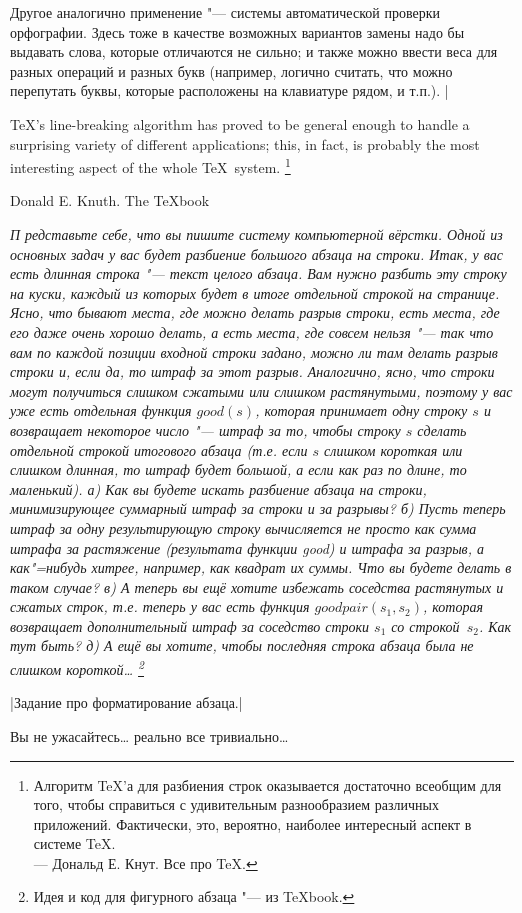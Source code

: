 Другое аналогично применение "--- системы автоматической проверки орфографии. Здесь тоже в качестве 
возможных вариантов замены надо бы выдавать слова, которые отличаются не сильно; и также можно 
ввести веса для разных операций и разных букв (например, логично считать, что можно перепутать 
буквы, которые расположены на клавиатуре рядом, и т.п.).
|

%

\epigraph{\rm\TeX's line-breaking algorithm
has proved to be general enough to handle a surprising variety of
different applications; this, in fact, is probably the most interesting
aspect of the whole \TeX\ system.%
\footnote{\raggedright Алгоритм \TeX'а для разбиения строк оказывается достаточно всеобщим для того, чтобы 
справиться с удивительным разнообразием различных приложений. Фактически, это, вероятно, наиболее 
интересный аспект в системе \TeX.\\
\hspace{0.3\textwidth}--- Дональд Е. Кнут. Все про \TeX.}
}{Donald E. Knuth. The \TeX book}


\newlength\varunit
\newlength\firstlinehang
{
%
\parfillskip=0pt

\it П%
%
редставьте себе, что вы пишите систему компьютерной вёрстки. Одной из основных задач у вас 
будет разбиение большого абзаца на строки. Итак, у вас есть длинная строка "--- текст целого 
абзаца. Вам нужно разбить эту строку на куски, каждый из которых будет в итоге отдельной строкой на 
странице. Ясно, что бывают места, где можно делать разрыв строки, есть места, где его даже очень 
хорошо делать, а есть места, где совсем нельзя "--- так что вам по каждой позиции входной строки 
задано, можно ли там делать разрыв строки и, если да, то штраф за этот разрыв. Аналогично, ясно, 
что строки могут получиться слишком сжатыми или слишком растянутыми, поэтому у вас уже есть 
отдельная функция $good(s)$, которая принимает одну строку $s$ и возвращает некоторое число "--- 
штраф за то, чтобы строку $s$ сделать отдельной строкой итогового абзаца (т.е. если $s$ слишком 
короткая или слишком длинная, то штраф будет большой, а если как раз по длине, то маленький). 
а) Как вы будете искать разбиение абзаца на строки, минимизирующее суммарный штраф за строки и за 
разрывы? б) Пусть теперь штраф за одну результирующую строку вычисляется не просто как сумма штрафа 
за растяжение (результата функции good) и штрафа за разрыв, а как"=нибудь хитрее, например, как 
квадрат их суммы. Что вы будете делать в таком случае? в) А теперь вы ещё хотите избежать 
соседства растянутых и сжатых строк, т.е. теперь у вас есть функция $goodpair(s_1,s_2)$, которая 
возвращает дополнительный штраф за соседство строки $s_1$ со строкой~$s_2$. Как тут быть? 
д) А ещё вы хотите, чтобы последняя строка 
абзаца была не слишком короткой\dots%
\footnote{Идея и код для фигурного абзаца "--- из \TeX book.}

}

\let\afterwriteans\relax
\writeansno{\tsk}|Задание про форматирование абзаца.|

\vspace{0.5cm}

\epigraph{Вы не ужасайтесь\dots{} реально все тривиально\dots}{}

\vfill\pagebreak